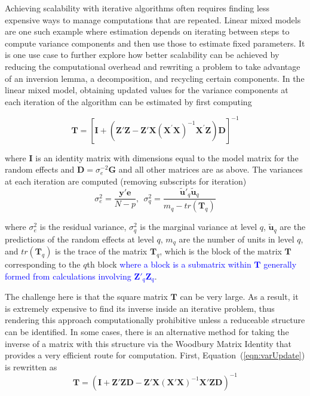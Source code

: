 \documentclass[12pt]{article}
\begin{document}
Achieving scalability with iterative algorithms often requires finding less expensive ways to manage computations that are repeated. Linear mixed models are one such example where estimation depends on iterating between steps to compute variance components and then use those to estimate fixed parameters. It is one use case to further explore how better scalability can be achieved by reducing the computational overhead and rewriting a problem to take advantage of an inversion lemma, a decomposition, and recycling certain components. In the linear mixed model, obtaining updated values for the variance components at each iteration of the algorithm can be estimated by first computing \cite{mcandsearle:2001}

\begin{equation}
	\label{eqn:varUpdate}
	\bm{T} = \left[\bm{I} + \left(\bm{Z}'\bm{Z} - \bm{Z}'\bm{X} (\bm{X}^{'}\bm{X})^{-1} \bm{X}^{'}\bm{Z}\right)\bm{D}\right]^{-1}
\end{equation}

\noindent where $\bm{I}$ is an identity matrix with dimensions equal to the model matrix for the random effects and $\bm{D} = \sigma_{e}^{-2}\bm{G}$ and all other matrices are as above. The variances at each iteration are computed (removing subscripts for iteration)
\begin{equation}
	\label{eqn:vars:mixed}
	\sigma_{e}^2 = \frac{\bm{y}'\bm{e}}{N-p}, \ \ \sigma^2_{q} = \frac{\widetilde{\bm{u}}'_{q}\widetilde{\bm{u}}_{q}} {m_q - tr(\bm{T}_q)} 
\end{equation}

\noindent where $\sigma_{e}^2$ is the residual variance, $\sigma^2_{q}$ is the marginal variance at level $q$, $\widetilde{\bm{u}}_q$ are the predictions of the random effects at level $q$, $m_q$ are the number of units in level $q$, and $tr(\bm{T}_q)$ is the trace of the matrix $\bm{T}_q$, which is the block of the matrix $\bm{T}$ corresponding to the $q$th block \textcolor{blue}{where a block is a submatrix within $\bm{T}$ generally formed from calculations involving $\bm{Z}'_q\bm{Z}_q$}. 

The challenge here is that the square matrix $\bm{T}$ can be very large. As a result, it is extremely expensive to find its inverse inside an iterative problem, thus rendering this approach computationally prohibitive unless a reduceable structure can be identified. In some cases, there is an alternative method for taking the inverse of a matrix with this structure via the Woodbury Matrix Identity \cite{Woodbury1950} that provides a very efficient route for computation. First, Equation~(\ref{eqn:varUpdate}) is rewritten as
\begin{equation}
	\label{eqn:varStep1}
	\bm{T} = \left(\bm{I} +  \bm{Z}'\bm{Z}\bm{D} - \bm{Z}'\bm{X} (\bm{X}'\bm{X})^{-1} \bm{X}'\bm{Z}\bm{D}\right)^{-1}
\end{equation}
\end{document}
